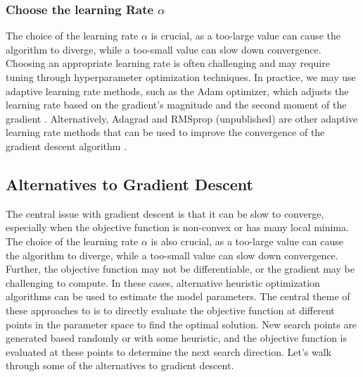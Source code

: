 \documentclass{article}[11pt]
\begin{document}
\subsubsection*{Choose the learning Rate $\alpha$}
The choice of the learning rate $\alpha$ is crucial, as a too-large value can cause the algorithm to diverge, while a too-small value can slow down convergence.
Choosing an appropriate learning rate is often challenging and may require tuning through hyperparameter optimization techniques. 
In practice, we may use adaptive learning rate methods, such as the Adam optimizer, which adjusts the learning rate based on the gradient's magnitude and the second moment of the gradient \cite{ADAM-2014}.
Alternatively, Adagrad and RMSprop (unpublished) are other adaptive learning rate methods that can be used to improve the convergence of the gradient descent algorithm \cite{ADAGrad2011}.


\subsection{Alternatives to Gradient Descent}
The central issue with gradient descent is that it can be slow to converge, especially when the objective function is non-convex or has many local minima.
The choice of the learning rate $\alpha$ is also crucial, as a too-large value can cause the algorithm to diverge, while a too-small value can slow down convergence.
Further, the objective function may not be differentiable, or the gradient may be challenging to compute.
In these cases, alternative heuristic optimization algorithms can be used to estimate the model parameters.
The central theme of these approaches to is to directly evaluate the objective function at different points in the parameter space to find the optimal solution.
New search points are generated based randomly or with some heuristic, and the objective function is evaluated at these points to determine the next search direction.
Let's walk through some of the alternatives to gradient descent.
\end{document}
